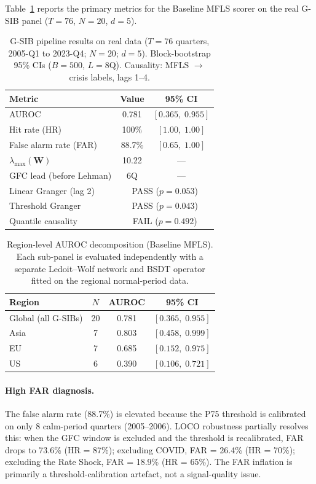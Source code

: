 \documentclass[11pt]{article}
\theoremstyle{definition}
\newcommand{\lmax}{\lambda_{\max}}
\begin{document}
Table~\ref{tab:gsib} reports the primary metrics for the Baseline MFLS
scorer on the real G-SIB panel ($T=76$, $N=20$, $d=5$).

\begin{table}[htbp]
\centering
\caption{G-SIB pipeline results on real data ($T=76$ quarters, 2005-Q1 to
2023-Q4; $N=20$; $d=5$).  Block-bootstrap 95\% CIs ($B=500$, $L=8$Q).
Causality: MFLS $\to$ crisis labels, lags 1--4.}
\label{tab:gsib}
\begin{tabular}{lcc}
\toprule
Metric & Value & 95\% CI \\
\midrule
AUROC                     & 0.781 & $[0.365,\; 0.955]$ \\
Hit rate (HR)             & 100\% & $[1.00,\; 1.00]$ \\
False alarm rate (FAR)    & 88.7\% & $[0.65,\; 1.00]$ \\
$\lmax(\mathbf{W})$       & 10.22 & --- \\
GFC lead (before Lehman)  & 6Q    & --- \\
\midrule
Linear Granger (lag 2)    & \multicolumn{2}{c}{PASS ($p = 0.053$)} \\
Threshold Granger         & \multicolumn{2}{c}{PASS ($p = 0.043$)} \\
Quantile causality        & \multicolumn{2}{c}{FAIL ($p = 0.492$)} \\
\bottomrule
\end{tabular}
\end{table}

\begin{table}[htbp]
\centering
\caption{Region-level AUROC decomposition (Baseline MFLS).
Each sub-panel is evaluated independently with a separate Ledoit--Wolf
network and BSDT operator fitted on the regional normal-period data.}
\label{tab:region_auroc}
\begin{tabular}{lccc}
\toprule
Region & $N$ & AUROC & 95\% CI \\
\midrule
Global (all G-SIBs) & 20 & 0.781 & $[0.365,\; 0.955]$ \\
Asia                 &  7 & 0.803 & $[0.458,\; 0.999]$ \\
EU                   &  7 & 0.685 & $[0.152,\; 0.975]$ \\
US                   &  6 & 0.390 & $[0.106,\; 0.721]$ \\
\bottomrule
\end{tabular}
\end{table}

\paragraph{High FAR diagnosis.}
The false alarm rate (88.7\%) is elevated because the P75 threshold is
calibrated on only 8 calm-period quarters (2005--2006).  LOCO robustness
partially resolves this: when the GFC window is excluded and the threshold
is recalibrated, FAR drops to 73.6\% (HR = 87\%); excluding COVID,
FAR = 26.4\% (HR = 70\%); excluding the Rate Shock, FAR = 18.9\% (HR = 65\%).
The FAR inflation is primarily a threshold-calibration artefact, not a
signal-quality issue.
\end{document}
